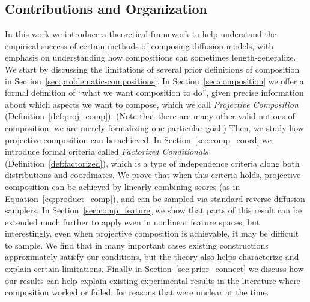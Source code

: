 \subsection{Contributions and Organization}
In this work we introduce a theoretical framework
to help understand 
the empirical success of certain methods of 
composing diffusion models,
with emphasis on
understanding how compositions can sometimes
length-generalize. 
We start by discussing the limitations
of several prior definitions of composition
in Section~\ref{sec:problematic-compositions}.
In Section~\ref{sec:composition} we offer a formal definition of
``what we want composition to do'',
given precise information about which aspects we want to compose, which we call \emph{Projective Composition} (Definition~\ref{def:proj_comp}).
(Note that there are many other valid notions of composition;
we are merely formalizing one particular goal.)
Then,
we study how projective composition can be achieved.
In Section~\ref{sec:comp_coord} we introduce formal criteria called
\emph{Factorized Conditionals} (Definition~\ref{def:factorized}),
which is a type of independence criteria along both distributions and coordinates. We prove that when this criteria holds, 
projective composition
can be achieved by linearly combining scores (as in Equation~\ref{eq:product_comp}),
and can be sampled via standard reverse-diffusion samplers.
In Section~\ref{sec:comp_feature} we show that parts of this result can be extended much further to apply even in
nonlinear feature spaces; but interestingly, even when projective composition is achievable, it may be difficult to sample.
We find that in many important cases existing constructions approximately satisfy our conditions, but the theory also helps characterize and explain certain limitations.
Finally in Section~\ref{sec:prior_connect} we discuss how our results can help explain existing experimental results in the literature where composition worked or failed, for reasons that were unclear at the time.











